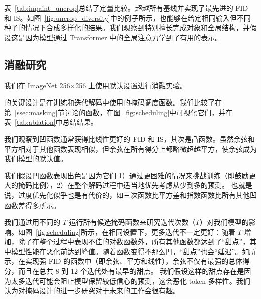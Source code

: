 表~\ref{tab:inpaint_uncrop}总结了定量比较。\model 超越所有基线并实现了最先进的 FID 和 IS。如图~\ref{fig:uncrop_diversity}中的例子所示，\model 也能够在给定相同输入但不同种子的情况下合成多样化的结果。我们观察到\model 特别擅长完成对象和全局结构，并假设这是因为模型通过 Transformer 中的全局注意力学到了有用的表示。

\subsection{消融研究}

\label{ssec:ablation}
我们在 ImageNet 256$\times$256 上使用默认设置进行消融实验。

\model 的关键设计是在训练和迭代解码中使用的掩码调度函数。我们比较了在第~\ref{ssec:masking}节讨论的函数，在图~\ref{fig:scheduling}中可视化它们，并在表~\ref{tab:ablation}中总结结果。

我们观察到凹函数通常获得比线性更好的 FID 和 IS，其次是凸函数。虽然余弦和平方相对于其他函数表现相似，但余弦在所有得分上都略微超越平方，使余弦成为我们模型的默认值。

我们假设凹函数表现出色是因为它们 1）通过更困难的情况来挑战训练（即鼓励更大的掩码比例），2）在整个解码过程中适当地优先考虑从少到多的预测。
也就是说，过度优先化似乎也是有代价的，如三次函数比平方差和指数函数比所有其他凹函数差得多所示。



我们通过用不同的 $T$ 运行所有候选掩码函数来研究迭代次数（$T$）对我们模型的影响。如图~\ref{fig:scheduling}所示，在相同设置下，更多迭代不一定更好：随着 $T$ 增加，除了在整个过程中表现不佳的对数函数外，所有其他函数都达到了``甜点''，其中模型性能在恶化前达到峰值。随着函数变得不那么凹，``甜点''也会``延迟''。如所示，在实现强 FID 的函数中（即余弦、平方和线性），余弦不仅有最强的总体得分，而且在总共 8 到 12 个迭代处有最早的甜点。
我们假设这样的甜点存在是因为太多迭代可能会阻止模型保留较低信心的预测，这会恶化 token 多样性。我们认为对掩码设计的进一步研究对于未来的工作会很有趣。

